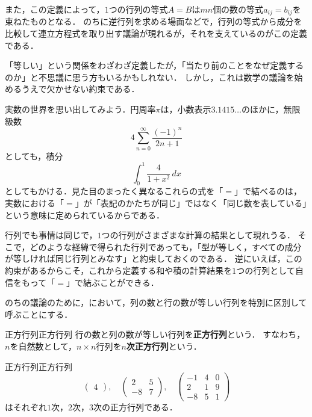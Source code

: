 \newpage 

また，この定義によって，$1$つの行列の等式$A = B$は$mn$個の数の等式$a_{ij} = b_{ij}$を束ねたものとなる．
のちに逆行列を求める場面などで，行列の等式から成分を比較して連立方程式を取り出す議論が現れるが，それを支えているのがこの定義である．
 
\begin{remark}[行列の相等を考える意義]
  「等しい」という関係をわざわざ定義したが，「当たり前のことをなぜ定義するのか」と不思議に思う方もいるかもしれない．
  しかし，これは数学の議論を始めるうえで欠かせない約束である．
 
  実数の世界を思い出してみよう．円周率$\pi$は，小数表示$3.1415\ldots$のほかに，無限級数
  \[
    4 \sum_{n=0}^{\infty} \frac{(-1)^n}{2n+1}
  \]
  としても，積分
  \[
    \int_0^1 \frac{4}{1 + x^2} \, dx
  \]
  としてもかける．見た目のまったく異なるこれらの式を「$=$」で結べるのは，実数における「$=$」が「表記のかたちが同じ」ではなく「同じ数を表している」という意味に定められているからである．
 
  行列でも事情は同じで，$1$つの行列がさまざまな計算の結果として現れうる．
  そこで，どのような経緯で得られた行列であっても，「型が等しく，すべての成分が等しければ同じ行列とみなす」と約束しておくのである．
  逆にいえば，この約束があるからこそ，これから定義する和や積の計算結果を$1$つの行列として自信をもって「$=$」で結ぶことができる．
\end{remark}

のちの議論のために，において，列の数と行の数が等しい行列を特別に区別して呼ぶことにする．

\begin{definition}{正方行列}{正方行列}
  行の数と列の数が等しい行列を\textbf{正方行列}という．
  すなわち，$n$を自然数として，$n \times n$行列を\textbf{$n$次正方行列}という．
\end{definition}

\begin{example}{正方行列}{正方行列}
  \[
    \begin{pmatrix} 4 \end{pmatrix}, \quad
    \begin{pmatrix} 2 & 5 \\ -8 & 7 \end{pmatrix}, \quad
    \begin{pmatrix} -1 & 4 & 0 \\ 2 & 1 & 9 \\ -8 & 5 & 1 \end{pmatrix}
  \]
  はそれぞれ$1$次，$2$次，$3$次の正方行列である．
\end{example}

